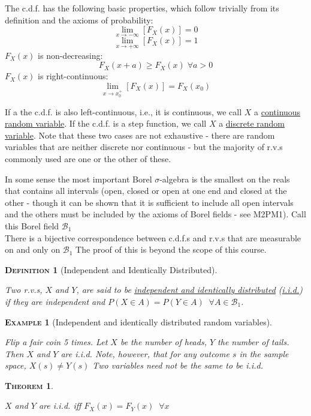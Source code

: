 \documentclass[12pt,a4paper]{article}
\newtheorem{definition}{\textsc{Definition}}[section]
\newtheorem{example}{\textsc{Example}}[section]
\newtheorem{theorem}{\textsc{Theorem}}[section]
\begin{document}
The c.d.f. has the following basic properties, which follow trivially from its definition and the axioms of probability:
$$\lim_{x \rightarrow - \infty}[F_X(x)] = 0$$
$$\lim_{x \rightarrow + \infty}[F_X(x)] = 1$$
$F_X(x)$ is non-decreasing: $$F_X(x + a) \geq F_X(x)\; \forall a > 0$$
$F_X(x)$ is right-continuous: $$\lim_{x \rightarrow x_0^+}[F_X(x)] = F_X(x_0)$$

If a the c.d.f. is also left-continuous, i.e., it is continuous, we call $X$ a \underline{continuous random variable}. If the c.d.f. is a step function, we call $X$ a \underline{discrete random variable}. Note that these two cases are not exhaustive - there are random variables that are neither discrete nor continuous - but the majority of r.v.s commonly used are one or the other of these.

In some sense the most important Borel $\sigma$-algebra is the smallest on the reals that contains all intervals (open, closed or open at one end and closed at the other - though it can be shown that it is sufficient to include all open intervals and the others must be included by the axioms of Borel fields - see M2PM1). Call this Borel field $\mathcal{B}_1$\\
\indent There is a bijective correspondence between c.d.f.s and r.v.s that are measurable on and only on $\mathcal{B}_1$ The proof of this is beyond the scope of this course.

\begin{definition}[Independent and Identically Distributed]$\;$\par
\vspace{1cm}

Two r.v.s, $X$ and $Y$, are said to be \underline{independent and identically distributed} (\underline{i.i.d.}) if they are independent and $P(X \in A) = P(Y \in A)\;\;\forall A \in \mathcal{B}_1$.
\end{definition}

\begin{example}[Independent and identically distributed random variables]$\;$\par
\vspace{1cm}

Flip a fair coin 5 times. Let $X$ be the number of heads, $Y$ the number of tails. Then $X$ and $Y$ are i.i.d. Note, however, that for any outcome $s$ in the sample space, $X(s) \neq Y(s)$ Two variables need not be the same to be i.i.d.
\end{example}

\begin{theorem}$\;$\par
\vspace{1cm}

$X$ and $Y$ are i.i.d. iff $F_X(x) = F_Y(x) \;\;\forall x$
\end{theorem}
\end{document}
